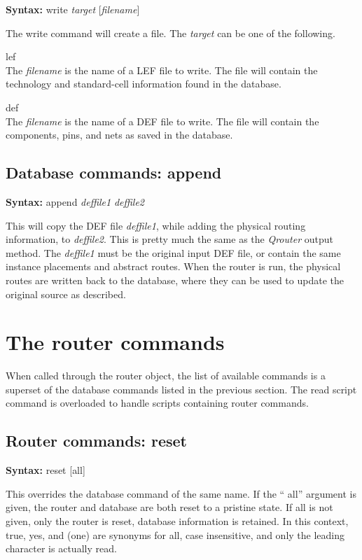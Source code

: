 {\bf Syntax:} {\vt write} {\it target} [{\it filename\/}]

The {\vt write} command will create a file.  The {\it target} can be
one of the following.
\begin{description}
\item{\vt lef}\\
The {\it filename} is the name of a LEF file to write.  The file will
contain the technology and standard-cell information found in the
database.

\item{\vt def}\\
The {\it filename} is the name of a DEF file to write.  The file will
contain the components, pins, and nets as saved in the database.
\end{description}

\subsection{Database commands: {\vt append}}

{\bf Syntax:} {\vt append} {\it deffile1} {\it deffile2}

This will copy the DEF file {\it deffile1}, while adding the physical
routing information, to {\it deffile2}.  This is pretty much the same
as the {\it Qrouter} output method.  The {\it deffile1} must be the
original input DEF file, or contain the same instance placements and
abstract routes.  When the router is run, the physical routes are
written back to the database, where they can be used to update the
original source as described.


\section{The router commands}

When called through the router object, the list of available commands
is a superset of the database commands listed in the previous section.
The {\vt read script} command is overloaded to handle scripts containing
router commands.

\subsection{Router commands: {\vt reset}}

{\bf Syntax:} {\vt reset} [{\vt all}]

This overrides the database command of the same name.  If the ``{\vt
all}'' argument is given, the router and database are both reset to a
pristine state.  If {\vt all} is not given, only the router is reset,
database information is retained.  In this context, {\vt true}, {\vt
yes}, and {} (one) are synonyms for {\vt all}, case insensitive,
and only the leading character is actually read.


